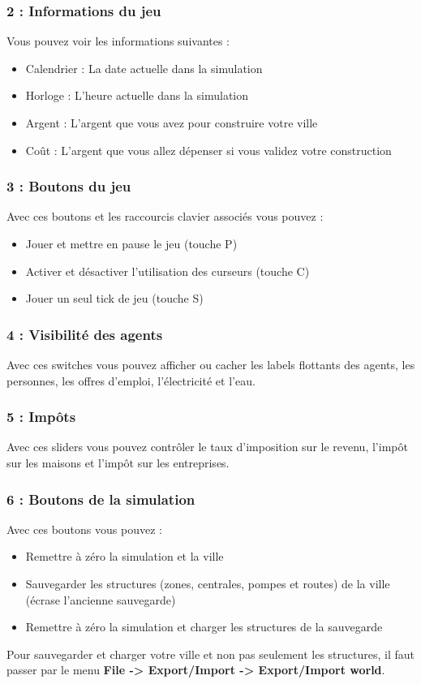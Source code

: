 \documentclass[11pt]{report}
\begin{document}
\subsubsection{2 : Informations du jeu}
Vous pouvez voir les informations suivantes :
\begin{itemize}
	\item Calendrier : La date actuelle dans la simulation
	\item Horloge : L'heure actuelle dans la simulation
	\item Argent : L'argent que vous avez pour construire votre ville
	\item Coût : L'argent que vous allez dépenser si vous validez votre construction
\end{itemize}

\subsubsection{3 : Boutons du jeu}
Avec ces boutons et les raccourcis clavier associés vous pouvez :
\begin{itemize}
	\item Jouer et mettre en pause le jeu (touche P)
	\item Activer et désactiver l'utilisation des curseurs (touche C)
	\item Jouer un seul tick de jeu (touche S)
\end{itemize}

\subsubsection{4 : Visibilité des agents}
Avec ces switches vous pouvez afficher ou cacher les labels flottants des agents, les personnes, les offres d'emploi, l'électricité et l'eau.

\subsubsection{5 : Impôts}
Avec ces sliders vous pouvez contrôler le taux d'imposition sur le revenu, l'impôt sur les maisons et l'impôt sur les entreprises.

\subsubsection{6 : Boutons de la simulation}
Avec ces boutons vous pouvez :
\begin{itemize}
	\item Remettre à zéro la simulation et la ville
	\item Sauvegarder les structures (zones, centrales, pompes et routes) de la ville (écrase l'ancienne sauvegarde)
	\item Remettre à zéro la simulation et charger les structures de la sauvegarde
\end{itemize}
Pour sauvegarder et charger votre ville et non pas seulement les structures, il faut passer par le menu \textbf{File -> Export/Import -> Export/Import world}.
\end{document}
